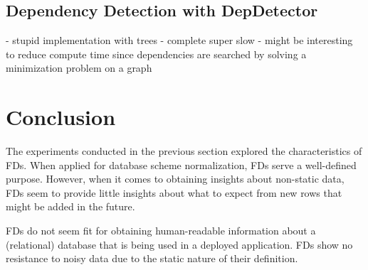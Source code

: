 \subsection{Dependency Detection with DepDetector}
- stupid implementation with trees
- complete super slow
- might be interesting to reduce compute time since dependencies are searched by solving a minimization problem on a graph

\section{Conclusion}
The experiments conducted in the previous section explored the characteristics of FDs.
When applied for database scheme normalization, FDs serve a well-defined purpose.
However, when it comes to obtaining insights about non-static data, FDs seem to provide little insights about what to expect from new rows that might be added in the future.

FDs do not seem fit for obtaining human-readable information about a (relational) database that is being used in a deployed application.
FDs show no resistance to noisy data due to the static nature of their definition.
